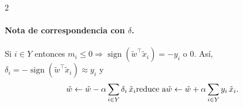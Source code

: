 \documentclass[11pt]{article}
\begin{document}
\begin{multicols}{2}
\paragraph{Nota de correspondencia con $\delta$.}
Si $i\in Y$ entonces $m_i\le 0\Rightarrow \operatorname{sign}(\tilde{w}^\top\tilde{x}_i)=-y_i$ o $0$.
Así, $\delta_i=-\operatorname{sign}(\tilde{w}^\top\tilde{x}_i)\approx y_i$ y
\[
\tilde{w}\leftarrow \tilde{w}-\alpha\sum_{i\in Y}\delta_i\,\tilde{x}_i
\\\text{reduce a}\\
\tilde{w}\leftarrow \tilde{w}+\alpha\sum_{i\in Y} y_i\,\tilde{x}_i.
\]


\end{multicols}
\end{document}
